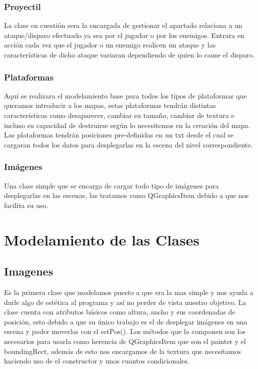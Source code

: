 \documentclass{article}
\begin{document}
            \subsubsection{Proyectil}
            La clase en cuestión sera la encargada de gestionar el apartado relaciona a un ataque/disparo efectuado ya sea por el jugador o por los enemigos. Entrara en acción cada vez que el jugador o un enemigo realicen un ataque y las características de dicho ataque variaran dependiendo de quien lo cause el disparo.
            
            \subsubsection{Plataformas}
            Aquí se realizara el modelamiento base para todos los tipos de plataformas que queramos introducir a los mapas, estas plataformas tendrán distintas características como desaparecer, cambiar su tamaño, cambiar de textura e incluso su capacidad de destruirse según lo necesitemos en la creación del mapa. Las plataformas tendrán posiciones pre-definidas en un txt desde el cual se cargaran todos los datos para desplegarlas en la escena del nivel correspondiente.
            
            \subsubsection{Imágenes}
            Una clase simple que se encarga de cargar todo tipo de imágenes para desplegarlas en las escenas, las tratamos como QGraphicsItem debido a que nos facilita su uso.
    
\section{Modelamiento de las Clases}
    \subsection{Imagenes}
    Es la primera clase que modelamos puesto a que era la mas simple y nos ayuda a darle algo de estética al programa y así no perder de vista nuestro objetivo. La clase cuenta con atributos básicos como altura, ancho y sus coordenadas de posición, esto debido a que su único trabajo es el de desplegar imágenes en una escena y poder moverlas con el setPos(). Los métodos que la componen son los necesarios para usarla como herencia de QGraphicsItem que son el painter y el boundingRect, además de esto nos encargamos de la textura que necesitamos haciendo uso de el constructor y unos cuantos condicionales.
    
\end{document}

